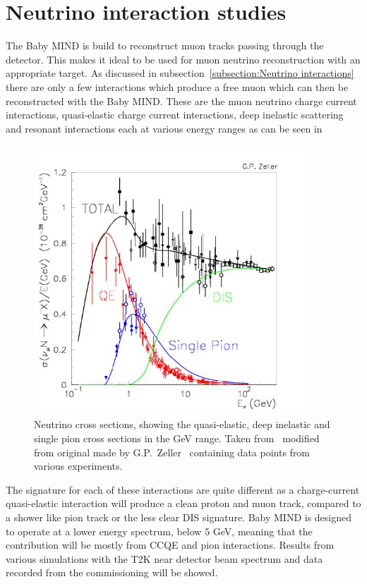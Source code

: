 \chapter{Neutrino interaction studies}
\label{c:neutrino}

The Baby MIND is build to reconstruct muon tracks passing through the detector. This makes it ideal to be used for muon neutrino reconstruction with an appropriate target. As discussed in subsection~\ref{subsection:Neutrino interactions} there are only a few interactions which produce a free muon which can then be reconstructed with the Baby MIND. These are the muon neutrino charge current interactions, quasi-elastic charge current interactions, deep inelastic scattering and resonant interactions each at various energy ranges as can be seen in 

\begin{figure}[h!]
\centering
\includegraphics[width=0.9\textwidth]{figures/figs_zeller-total-numode.png}
\caption{Neutrino cross sections, showing the quasi-elastic, deep inelastic and single pion cross sections in the GeV range. Taken from~\cite{82McFarland} modified from original made by G.P.~Zeller~\cite{13PDG} containing data points from various experiments.}
\label{fig:neutrinoInteractionsFig}
\end{figure}

The signature for each of these interactions are quite different as a charge-current quasi-elastic interaction will produce a clean proton and muon track, compared to a shower like pion track or the less clear DIS signature. Baby MIND is designed to operate at a lower energy spectrum, below 5 GeV, meaning that the contribution will be mostly from CCQE and pion interactions. Results from various simulations with the T2K near detector beam spectrum and data recorded from the commissioning will be showed.

